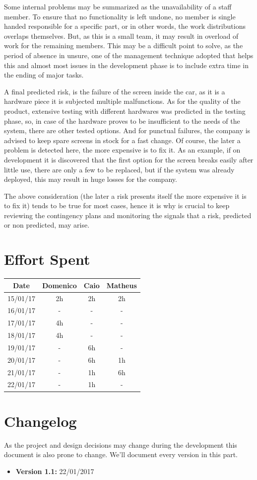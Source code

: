 \documentclass[a4paper]{article}
\begin{document}
Some internal problems may be summarized as the unavailability of a staff member. To ensure that no functionality is left undone, no member is single handed responsible for a specific part, or in other words, the work distributions overlaps themselves.  But, as this is a small team, it may result in overload of work for the remaining members. This may be a difficult point to solve, as the period of absence in unsure, one of the management technique adopted that helps this and almost most issues in the development phase is to include extra time in the ending of major tasks.      

A final predicted risk, is the failure of the screen inside the car, as it is a hardware piece it is subjected multiple malfunctions. As for the quality of the product, extensive testing with different hardwares was predicted in the testing phase, so, in case of the hardware proves to be insufficient to the needs of the system, there are other tested options. And for punctual failures, the company is advised to keep spare screens in stock for a fast change. Of course, the later a problem is detected here, the more expensive is to fix it. As an example, if on development it is discovered that the first option for the screen breaks easily after little use, there are only a few to be replaced, but if the system was already deployed, this may result in huge losses for the company. 

The above consideration (the later a risk presents itself the more expensive it is to fix it) tends to be true for most cases, hence it is why is crucial to keep reviewing the contingency plans and monitoring the signals that a risk, predicted or non predicted, may arise. 


\newpage
\section{Effort Spent}
\begin{tabular}{ | c | c | c | c | }
\hline
	\textbf {Date} & \textbf {Domenico} & \textbf {Caio} & \textbf {Matheus} \\ \hline
	15/01/17& 2h & 2h & 2h  \\ \hline
	16/01/17& - & - & - \\ \hline
	17/01/17& 4h & - & - \\ \hline
	18/01/17& 4h & - & - \\ \hline
	19/01/17& - & 6h & - \\ \hline
	20/01/17& - & 6h & 1h \\ \hline
	21/01/17& - & 1h & 6h \\ \hline
	22/01/17& - & 1h & - \\ \hline
\end{tabular}
\newpage

\section{Changelog}
As the project and design decisions may change during the development this document is also prone to change.
We'll document every version in this part.
\begin{itemize}
\item \textbf {Version 1.1:} 22/01/2017
\end{itemize}
\end{document}
